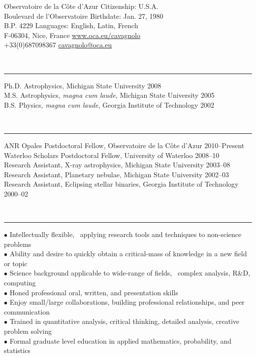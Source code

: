 \documentclass[12pt]{cv}
\begin{document}
\begin{center}
{\Large{}}\vspace{-0.3cm}
\end{center}
Observatoire de la C\^ote d'Azur \hfill Citizenship: U.S.A.\\
Boulevard de l'Observatoire \hfill Birthdate: Jan. 27\ths, 1980\\
B.P. 4229 \hfill Languages: English, Latin, French\\
F-06304, Nice, France \hfill \href{http://www.oca.eu/~cavagnolo/}{www.oca.eu/cavagnolo}\\
+33(0)687098367 \hfill \href{mailto:cavagnolo@oca.eu}{cavagnolo@oca.eu}

{\large{}}\vspace{-0.3cm}\\
\rule{\linewidth}{0.5pt}
Ph.D. Astrophysics, Michigan State University \hfill 2008\\
M.S. Astrophysics, \textit{magna cum laude}, Michigan State University \hfill 2005\\
B.S. Physics, \textit{magna cum laude}, Georgia Institute of Technology \hfill 2002

{\large{}}\vspace{-0.3cm}\\
\rule{\linewidth}{0.5pt}
ANR Opales Postdoctoral Fellow, Observatoire de la C\^ote d'Azur \hfill 2010--Present\\
Waterloo Scholars Postdoctoral Fellow, University of Waterloo \hfill 2008--10\\
Research Assistant, X-ray astrophysics, Michigan State University \hfill 2003--08\\
Research Assistant, Planetary nebulae, Michigan State University \hfill 2002--03\\
Research Assistant, Eclipsing stellar binaries, Georgia Institute of Technology \hfill 2000--02

{\large{}}\vspace{-0.3cm}\\
\rule{\linewidth}{0.5pt}
{\scriptsize{$\bullet$}} Intellectually flexible, \eg\ applying research tools and techniques to non-science problems\\
{\scriptsize{$\bullet$}} Ability and desire to quickly obtain a critical-mass of knowledge in a new field or topic\\
{\scriptsize{$\bullet$}} Science background applicable to wide-range of fields, \eg\ complex analysis, R\&D, computing\\
{\scriptsize{$\bullet$}} Honed professional oral, written, and presentation skills\\
{\scriptsize{$\bullet$}} Enjoy small/large collaborations, building professional relationships, and peer communication\\
{\scriptsize{$\bullet$}} Trained in quantitative analysis, critical thinking, detailed analysis, creative problem solving\\
{\scriptsize{$\bullet$}} Formal graduate level education in applied mathematics, probability, and statistics
\end{document}
